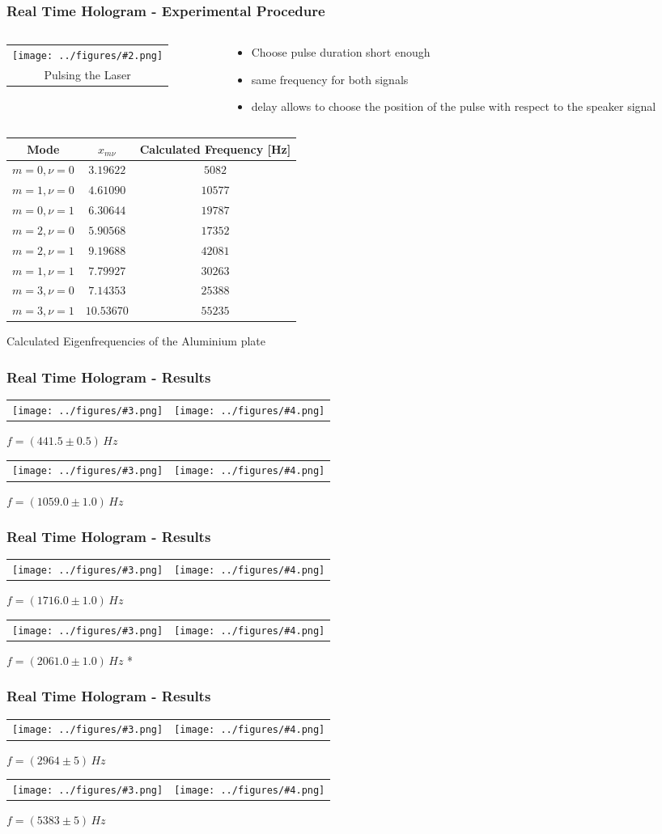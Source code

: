 \documentclass[10pt]{beamer}
\newcommand{\gra}[3][]{
	\begin{table}
	\centering
	\begin{tabular}[width=\textwidth]{c}
		\texttt{[image: ../figures/\#2.png]}\\
		\small #3
	\end{tabular}
	\end{table}
}
\newcommand{\graTwoOneC}[5]{
	\begin{table}
		\centering
		\begin{tabular}[width=\textwidth]{cc}
			\texttt{[image: ../figures/\#3.png]}&
			\texttt{[image: ../figures/\#4.png]}\\
		\end{tabular}
		#5
	\end{table}
}
\begin{document}
\begin{frame}
	\frametitle{Real Time Hologram - Experimental Procedure}
	\begin{columns}
		\begin{column}{0.5\textwidth}
		\gra{oszi-inv}{Pulsing the Laser}%
		\end{column}
		\begin{column}{0.5\textwidth}
			\begin{itemize}
				\item Choose pulse duration short enough
				\item same frequency for both signals
				\item delay allows to choose the position of the pulse with respect to the speaker signal
			\end{itemize}
		\end{column}
	\end{columns}
\end{frame}



\begin{frame}
	\begin{table}[h]
		\centering
		\begin{tabular}{c|c|c}
			Mode 		& $x_{m\nu}$ & Calculated Frequency [Hz] 	 \\ \hline\hline
			$m=0,\nu=0$	&$3.19622$   &$5082$						\\ \hline
			$m=1,\nu=0$	& $4.61090$  & $10577$					\\ \hline
			$m=0,\nu=1$	& $6.30644$  & $19787$					\\ \hline
			$m=2,\nu=0$	& $5.90568$  & $17352$					\\ \hline
			$m=2,\nu=1$	& $9.19688$  & $42081$					\\ \hline
			$m=1,\nu=1$	& $7.79927$  & $30263$				     \\ \hline
			$m=3,\nu=0$	& $7.14353$  & $25388$                \\ \hline
			$m=3,\nu=1$	& $10.53670$ & $55235$
		\end{tabular} \vskip 0.2cm
		{Calculated Eigenfrequencies of the Aluminium plate}
	\end{table}	
\end{frame}
\begin{frame}
	\frametitle{Real Time Hologram - Results}
	\graTwoOneC{0.4}{0.2}{aluminium2_edit}{aluminium2_lit}{$f=(441.5\pm0.5)\,\si{Hz}$}
	\graTwoOneC{0.4}{0.2}{aluminium3_edit}{aluminium3_lit}{$f=(1059.0\pm1.0)\,\si{Hz}$}
\end{frame}
\begin{frame}
	\frametitle{Real Time Hologram - Results}
	\graTwoOneC{0.4}{0.2}{aluminium6_edit}{aluminium6_lit}{$f=(1716.0\pm1.0)\,\si{Hz}$}
	\graTwoOneC{0.4}{0.2}{aluminium7_edit}{aluminium7_lit}{$f=(2061.0\pm1.0)\,\si{Hz}$ *}
\end{frame}
\begin{frame}
	\frametitle{Real Time Hologram - Results}
	\graTwoOneC{0.4}{0.2}{aluminium9_edit}{aluminium9_lit}{$f=(2964\pm5)\,\si{Hz}$}
	\graTwoOneC{0.4}{0.2}{aluminium10_edit}{aluminium10_lit}{$f=(5383\pm5)\,\si{Hz}$}
\end{frame}
\end{document}
